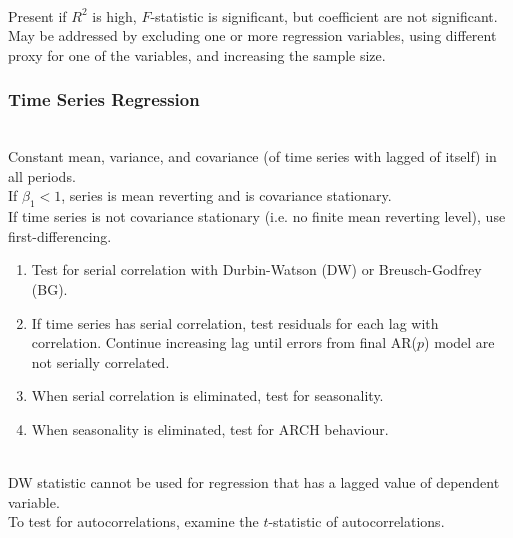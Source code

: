 \begin{method} \\
Present if $R^2$ is high, $F$-statistic is significant, but coefficient are not significant.\\
May be addressed by excluding one or more regression variables, using different proxy for one of the variables, and increasing the sample size.
\end{method}

\subsubsection{Time Series Regression}

\begin{method} \\
Constant mean, variance, and covariance (of time series with lagged of itself) in all periods.\\
If $\beta_1 < 1$, series is mean reverting and is covariance stationary.\\
If time series is not covariance stationary (i.e. no finite mean reverting level), use first-differencing.
\end{method}

\begin{method} 
\begin{enumerate}[label=\roman*.]
\setlength{\itemsep}{0pt}
\item Test for serial correlation with Durbin-Watson (DW) or Breusch-Godfrey (BG).
\item If time series has serial correlation, test residuals for each lag with correlation. Continue increasing lag until errors from final AR($p$) model are not serially correlated.
\item When serial correlation is eliminated, test for seasonality.
\item When seasonality is eliminated, test for ARCH behaviour.
\end{enumerate}
\end{method}

\begin{method} \\
DW statistic cannot be used for regression that has a lagged value of dependent variable.\\
To test for autocorrelations, examine the $t$-statistic of autocorrelations.
\end{method}
